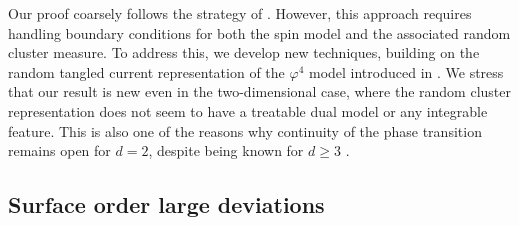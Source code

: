 \documentclass[11pt,a4paper]{article}
\theoremstyle{definition}
\numberwithin{equation}{section}
\begin{document}
Our proof coarsely follows the strategy of \cite{Severo24}. However, this approach requires handling boundary conditions for both the spin model and the associated random cluster measure. To address this, we develop new techniques, building on the random tangled current representation of the $\varphi^4$ model introduced in \cite{GunaratnamPanagiotisPanisSeveroPhi42022}. We stress that our result is new even in the two-dimensional case, where the random cluster representation does not seem to have a treatable dual model or any integrable feature. This is also one of the reasons why continuity of the phase transition remains open for $d=2$, despite being known for $d\geq3$ \cite{GunaratnamPanagiotisPanisSeveroPhi42022}.




\subsection{Surface order large deviations}\label{section:intro surface order large deviations}
\end{document}
